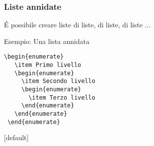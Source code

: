 \begin{frame}[fragile]
 \frametitle{Liste annidate}
 \'E possibile creare liste di liste, di liste, di liste ...

 
\begin{block}{Esempio: Una lista annidata}
\begin{code}
\begin{verbatim}
\begin{enumerate}
   \item Primo livello
   \begin{enumerate}
     \item Secondo livello
     \begin{enumerate}
       \item Terzo livello
     \end{enumerate}
   \end{enumerate}
 \end{enumerate}
\end{verbatim}
\end{code}
\end{block}
\end{frame}

[default]

